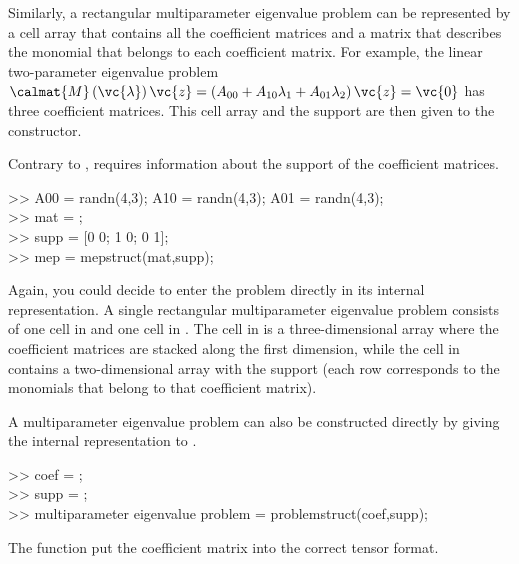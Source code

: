 \documentclass{manual}
\begin{document}
            Similarly, a rectangular multiparameter eigenvalue problem can be represented by a cell array that contains all the coefficient matrices and a matrix that describes the monomial that belongs to each coefficient matrix.
            For example, the linear two-parameter eigenvalue problem $\calmat{M} \left( \vc{\lambda} \right) \vc{z} = \left( A_{00} + A_{10} \lambda_1 + A_{01} \lambda_2 \right) \vc{z} = \vc{0}$ has three coefficient matrices.
            This cell array and the support are then given to the  constructor.
            \begin{code}
                Contrary to ,  requires information about the support of the coefficient matrices.
                \begin{codeblock}
                    >> A00 = randn(4,3); A10 = randn(4,3); A01 = randn(4,3); \\
                    >> mat = ; \\
                    >> supp = {[0 0; 1 0; 0 1]}; \\
                    >> mep = mepstruct(mat,supp);
                \end{codeblock}
            \end{code}
            Again, you could decide to enter the problem directly in its internal representation. 
            A single rectangular multiparameter eigenvalue problem consists of one cell in  and one cell in .
            The cell in  is a three-dimensional array where the coefficient matrices are stacked along the first dimension, while the cell in  contains a two-dimensional array with the support (each row corresponds to the monomials that belong to that coefficient matrix).
            \begin{code}
                A multiparameter eigenvalue problem can also be constructed directly by giving the internal representation to .
                \begin{codeblock}
                    >> coef = ; \\
                    >> supp = \string{{[}0 0; 1 0; 0 1{]}\string}; \\
                    >> multiparameter eigenvalue problem = problemstruct(coef,supp);
                \end{codeblock}
                \noindent The function  put the coefficient matrix into the correct tensor format.
            \end{code}
            
\end{document}
